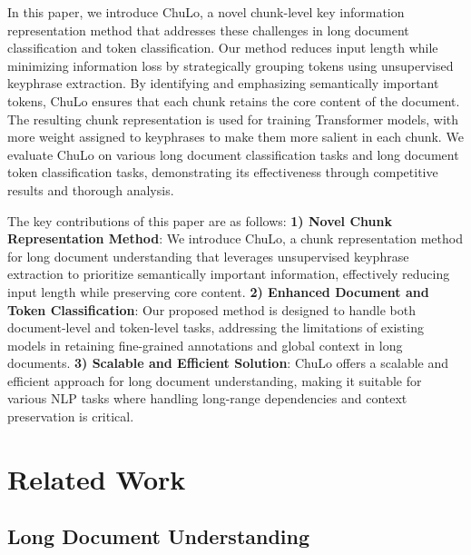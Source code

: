 \documentclass[11pt]{article}
\begin{document}
In this paper, we introduce ChuLo, a novel chunk-level key information representation method that addresses these challenges in long document classification and token classification. Our method reduces input length while minimizing information loss by strategically grouping tokens using unsupervised keyphrase extraction. By identifying and emphasizing semantically important tokens, ChuLo ensures that each chunk retains the core content of the document. The resulting chunk representation is used for training Transformer models, with more weight assigned to keyphrases to make them more salient in each chunk. We evaluate ChuLo on various long document classification tasks and long document token classification tasks, demonstrating its effectiveness through competitive results and thorough analysis.

The key contributions of this paper are as follows: 
\textbf{1) Novel Chunk Representation Method}: We introduce ChuLo, a chunk representation method for long document understanding that leverages unsupervised keyphrase extraction to prioritize semantically important information, effectively reducing input length while preserving core content.
\textbf{2) Enhanced Document and Token Classification}: Our proposed method is designed to handle both document-level and token-level tasks, addressing the limitations of existing models in retaining fine-grained annotations and global context in long documents.
\textbf{3) Scalable and Efficient Solution}: ChuLo offers a scalable and efficient approach for long document understanding, making it suitable for various NLP tasks where handling long-range dependencies and context preservation is critical.


\section{Related Work}

\subsection{Long Document Understanding}
\end{document}
